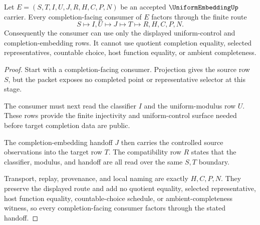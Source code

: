\begin{theorem}
\label{thm:uniform-embedding-completion-handoff}
Let $E=(S,T,I,U,J,R,H,C,P,N)$ be an accepted $\UniformEmbeddingUp$ carrier. Every completion-facing consumer of $E$ factors through the finite route
$$
S\longmapsto I,U\longmapsto J\longmapsto T\longmapsto R,H,C,P,N .
$$
Consequently the consumer can use only the displayed uniform-control and completion-embedding rows. It cannot use quotient completion equality, selected representatives, countable choice, host function equality, or ambient completeness.
\end{theorem}
\begin{proof}
Start with a completion-facing consumer. Projection gives the source row $S$, but the packet exposes no completed point or representative selector at this stage.

The consumer must next read the classifier $I$ and the uniform-modulus row $U$. These rows provide the finite injectivity and uniform-control surface needed before target completion data are public.

The completion-embedding handoff $J$ then carries the controlled source observations into the target row $T$. The compatibility row $R$ states that the classifier, modulus, and handoff are all read over the same $S,T$ boundary.

Transport, replay, provenance, and local naming are exactly $H,C,P,N$. They preserve the displayed route and add no quotient equality, selected representative, host function equality, countable-choice schedule, or ambient-completeness witness, so every completion-facing consumer factors through the stated handoff.
\end{proof}

\begin{closurestatus}{\UniformEmbeddingUp}
  \theoryclosure{\seedClosure}
  \formalstatus{\unformalizedV}
\end{closurestatus}
